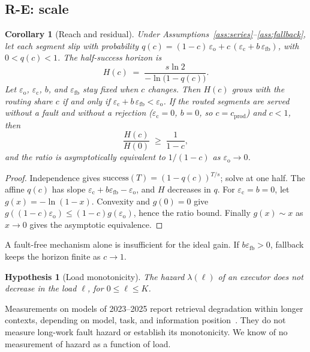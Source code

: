 \documentclass[11pt]{article}
\newtheorem{corollary}{Corollary}
\newtheorem{hypothesis}{Hypothesis}%
\theoremstyle{definition}
\theoremstyle{remark}
\newcommand{\eop}{\varepsilon_{\mathrm{o}}}
\newcommand{\ecl}{\varepsilon_{\mathrm{c}}}
\begin{document}
\subsection{R-E: scale}\label{sec:re}
\begin{corollary}[Reach and residual]\label{cor:reach}
Under Assumptions~\ref{ass:series}--\ref{ass:fallback}, let each segment slip with probability
$q(c)=(1-c)\,\eop+c\,(\ecl+b\,\varepsilon_{\mathrm{fb}})$, with $0<q(c)<1$. The half-success horizon
is
\[
H(c)\;=\;\frac{s\ln 2}{-\ln\bigl(1-q(c)\bigr)} .
\]
Let $\eop$, $\ecl$, $b$, and $\varepsilon_{\mathrm{fb}}$ stay fixed when $c$ changes. Then $H(c)$
grows with the routing share $c$ if and only if $\ecl+b\,\varepsilon_{\mathrm{fb}}<\eop$. If the
routed segments are served without a fault and without a rejection ($\ecl=0$, $b=0$, so
$c=c_{\mathrm{prod}}$) and $c<1$, then
\[
\frac{H(c)}{H(0)}\;\ge\;\frac{1}{1-c} ,
\]
and the ratio is asymptotically equivalent to $1/(1-c)$ as $\eop\to0$.
\end{corollary}
\begin{proof}
Independence gives $\mathrm{success}(T)=(1-q(c))^{T/s}$; solve at one half.
The affine $q(c)$ has slope $\ecl+b\varepsilon_{\mathrm{fb}}-\eop$, and $H$ decreases in $q$.
For $\ecl=b=0$, let $g(x)=-\ln(1-x)$.
Convexity and $g(0)=0$ give $g((1-c)\eop)\le(1-c)g(\eop)$, hence the ratio bound.
Finally $g(x)\sim x$ as $x\to0$ gives the asymptotic equivalence.
\end{proof}
A fault-free mechanism alone is insufficient for the ideal gain.
If $b\varepsilon_{\mathrm{fb}}>0$, fallback keeps the horizon finite as $c\to1$.

\begin{hypothesis}[Load monotonicity]\label{hyp:load}
The hazard $\lambda(\ell)$ of an executor does not decrease in the load $\ell$, for $0\le\ell\le K$.
\end{hypothesis}
Measurements on models of 2023--2025 report retrieval degradation within longer contexts, depending
on model, task, and information position~\cite{liu2023lost,modarressi2025nolima}.
They do not measure long-work fault hazard or establish its monotonicity.
We know of no measurement of hazard as a function of load.
\end{document}
